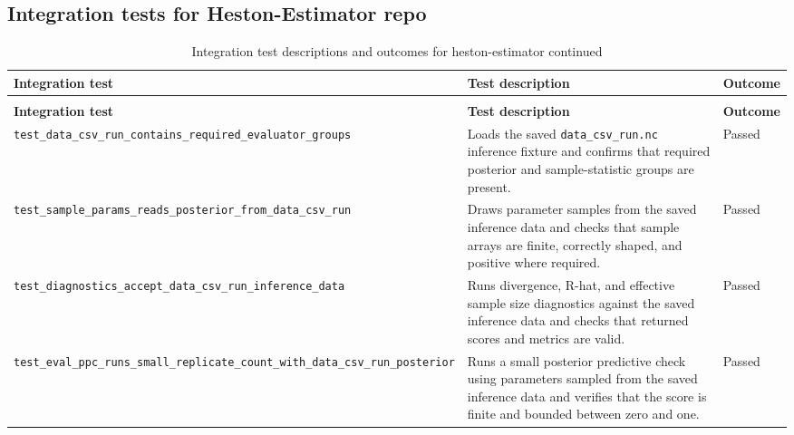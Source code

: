 \documentclass[11pt]{report}
\begin{document}
\subsection{Integration tests for Heston-Estimator repo}
{\small
\setlength{\LTpre}{0.5\baselineskip}
\setlength{\LTpost}{0.75\baselineskip}
\begin{longtable}{|L{0.30\textwidth}|L{0.45\textwidth}|L{0.10\textwidth}|}
\caption{Integration test descriptions and outcomes for heston-estimator}
\label{tab:integration-tests}\\
\hline
\textbf{Integration test} & \textbf{Test description} & \textbf{Outcome} \\
\hline
\endfirsthead
\caption[]{Integration test descriptions and outcomes for heston-estimator continued}\\
\hline
\textbf{Integration test} & \textbf{Test description} & \textbf{Outcome} \\
\hline
\endhead
\hline
\endfoot
\texttt{test\_\allowbreak data\_\allowbreak csv\_\allowbreak run\_\allowbreak contains\_\allowbreak required\_\allowbreak evaluator\_\allowbreak groups}
& Loads the saved \texttt{data\_csv\_run.nc} inference fixture and confirms that required posterior and sample-statistic groups are present.
& Passed \\
\hline
\texttt{test\_\allowbreak sample\_\allowbreak params\_\allowbreak reads\_\allowbreak posterior\_\allowbreak from\_\allowbreak data\_\allowbreak csv\_\allowbreak run}
& Draws parameter samples from the saved inference data and checks that sample arrays are finite, correctly shaped, and positive where required.
& Passed \\
\hline
\texttt{test\_\allowbreak diagnostics\_\allowbreak accept\_\allowbreak data\_\allowbreak csv\_\allowbreak run\_\allowbreak inference\_\allowbreak data}
& Runs divergence, R-hat, and effective sample size diagnostics against the saved inference data and checks that returned scores and metrics are valid.
& Passed \\
\hline
\texttt{test\_\allowbreak eval\_\allowbreak ppc\_\allowbreak runs\_\allowbreak small\_\allowbreak replicate\_\allowbreak count\_\allowbreak with\_\allowbreak data\_\allowbreak csv\_\allowbreak run\_\allowbreak posterior}
& Runs a small posterior predictive check using parameters sampled from the saved inference data and verifies that the score is finite and bounded between zero and one.
& Passed \\
\hline
\end{longtable}
}
\end{document}
